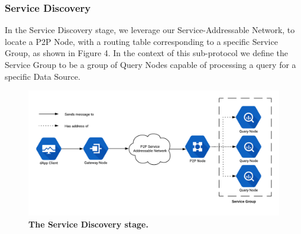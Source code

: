 \documentclass[12pt]{article}
\begin{document}
\subsubsection*{Service Discovery}
In the Service Discovery stage, we leverage our Service-Addressable Network, to locate a P2P Node, with a routing table corresponding to a specific Service Group, as shown in Figure 4. In the context of this sub-protocol we define the Service Group to be a group of Query Nodes capable of processing a query for a specific Data Source.
\begin{figure}[H]
\caption{\textbf{The Service Discovery stage.}}
\includegraphics[width=1\textwidth]{media/image10.png}
\end{figure}
\end{document}
